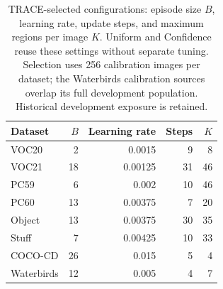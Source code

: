 \begin{table}[t]
\caption{TRACE-selected configurations: episode size $B$, learning rate, update steps, and maximum regions per image $K$. Uniform and Confidence reuse these settings without separate tuning. Selection uses 256 calibration images per dataset; the Waterbirds calibration sources overlap its full development population. Historical development exposure is retained.}
\label{tab:tuned-full-configurations}
\centering\small
\begin{tabular}{@{}lrrrr@{}}
\toprule
Dataset & $B$ & Learning rate & Steps & $K$ \\
\midrule
VOC20 & 2 & 0.0015 & 9 & 8 \\
VOC21 & 18 & 0.00125 & 31 & 46 \\
PC59 & 6 & 0.002 & 10 & 46 \\
PC60 & 13 & 0.00375 & 7 & 20 \\
Object & 13 & 0.00375 & 30 & 35 \\
Stuff & 7 & 0.00425 & 10 & 33 \\
COCO-CD & 26 & 0.015 & 5 & 4 \\
Waterbirds & 12 & 0.005 & 4 & 7 \\
\bottomrule
\end{tabular}
\end{table}
